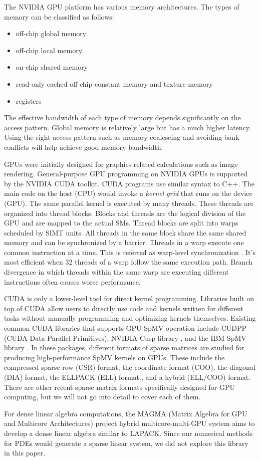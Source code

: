 The NVIDIA GPU platform has various memory architectures. The types of memory can be classified as follows:
\begin{itemize}
    \item off-chip global memory
    \item off-chip local memory
    \item on-chip shared memory
    \item read-only cached off-chip constant memory and texture memory
    \item registers
\end{itemize}

The effective bandwidth of each type of memory depends significantly on the access pattern. Global memory is relatively large but has a much higher latency. Using the right access pattern such as memory coalescing and avoiding bank conflicts will help achieve good memory bandwidth.


GPUs were initially designed for graphics-related calculations such as image rendering. General-purpose GPU programming on NVIDIA GPUs is supported by the NVIDIA CUDA toolkit. CUDA programs use similar syntax to C++. The main code on the host (CPU) would invoke a \textit{kernel grid} that runs on the device (GPU). The same parallel kernel is executed by many threads. These threads are organized into thread blocks. Blocks and threads are the logical division of the GPU and are mapped to the actual SMs. Thread blocks are split into warps scheduled by SIMT units. All threads in the same block share the same shared memory and can be synchronized by a barrier. Threads in a warp execute one common instruction at a time. This is referred as warp-level synchronization \citep{wilt2013cuda}. It's most efficient when 32 threads of a warp follow the same execution path. Branch divergence in which threads within the same warp are executing different instructions often causes worse performance.

CUDA is only a lower-level tool for direct kernel programming. Libraries built on top of CUDA allow users to directly use code and kernels written for different tasks without manually programming and optimizing kernels themselves. Existing common CUDA libraries that supports GPU SpMV operation include CUDPP (CUDA Data Parallel Primitives)\citep{harris2007cudpp}, NVIDIA Cusp library \citep{dalton2014cusp}, and the IBM SpMV library \citep{baskaran2009optimizing}. In these packages, different formats of sparse matrices are studied for producing high-performance SpMV kernels on GPUs. These include the compressed sparse row (CSR) format, the coordinate format (COO), the diagonal (DIA) format, the ELLPACK (ELL) format., and a hybrid (ELL/COO) format. There are other recent sparse matrix formats specifically designed for GPU computing, but we will not go into detail to cover each of them.

For dense linear algebra computations, the MAGMA (Matrix Algebra for GPU and Multicore Architectures) project hybrid multicore-multi-GPU system aims to develop a dense linear algebra similar to LAPACK\citep{agullo2009numerical}. Since our numerical methods for PDEs would generate a sparse linear system, we did not explore this library in this paper.


